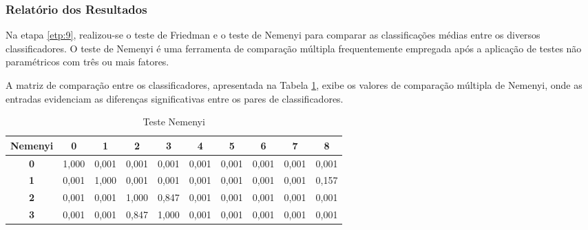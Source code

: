 \subsubsection{Relat\'orio dos Resultados}

Na etapa \ref{etp:9}, realizou-se o teste de Friedman e o teste de Nemenyi para comparar as classificações médias entre os diversos classificadores. O teste de Nemenyi é uma ferramenta de comparação múltipla frequentemente empregada após a aplicação de testes não paramétricos com três ou mais fatores.

A matriz de comparação entre os classificadores, apresentada na Tabela \ref{tb:nemeyi}, exibe os valores de comparação múltipla de Nemenyi, onde as entradas evidenciam as diferenças significativas entre os pares de classificadores.

\begin{table}[!htb]
	\centering
	\caption{Teste Nemenyi}\label{tb:nemeyi}
	\begin{tabular}{@{}clllllllll@{}}
		\toprule
		\multicolumn{1}{l}{\textbf{Nemenyi}} & \multicolumn{1}{c}{\textbf{0}} & \multicolumn{1}{c}{\textbf{1}} & \multicolumn{1}{c}{\textbf{2}} & \multicolumn{1}{c}{\textbf{3}} & \multicolumn{1}{c}{\textbf{4}} & \multicolumn{1}{c}{\textbf{5}} & \multicolumn{1}{c}{\textbf{6}} & \multicolumn{1}{c}{\textbf{7}} & \multicolumn{1}{c}{\textbf{8}} \\ \midrule
		\textbf{0}                           & 1,000                          & 0,001                          & 0,001                          & 0,001                          & 0,001                          & 0,001                          & 0,001                          & 0,001                          & 0,001                          \\
		\textbf{1}                           & 0,001                          & 1,000                          & 0,001                          & 0,001                          & 0,001                          & 0,001                          & 0,001                          & 0,001                          & 0,157                          \\
		\textbf{2}                           & 0,001                          & 0,001                          & 1,000                          & 0,847                          & 0,001                          & 0,001                          & 0,001                          & 0,001                          & 0,001                          \\
		\textbf{3}                           & 0,001                          & 0,001                          & 0,847                          & 1,000                          & 0,001                          & 0,001                          & 0,001                          & 0,001                          & 0,001                          \\

\end{tabular}
\end{table}
